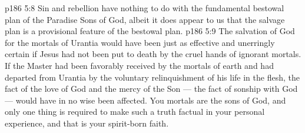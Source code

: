 \vs p186 5:8 Sin and rebellion have nothing to do with the fundamental bestowal plan of the Paradise Sons of God, albeit it does appear to us that the salvage plan is a provisional feature of the bestowal plan.
\vs p186 5:9 The salvation of God for the mortals of Urantia would have been just as effective and unerringly certain if Jesus had not been put to death by the cruel hands of ignorant mortals. If the Master had been favorably received by the mortals of earth and had departed from Urantia by the voluntary relinquishment of his life in the flesh, the fact of the love of God and the mercy of the Son --- the fact of sonship with God --- would have in no wise been affected. You mortals are the sons of God, and only one thing is required to make such a truth factual in your personal experience, and that is your spirit\hyp{}born faith.
